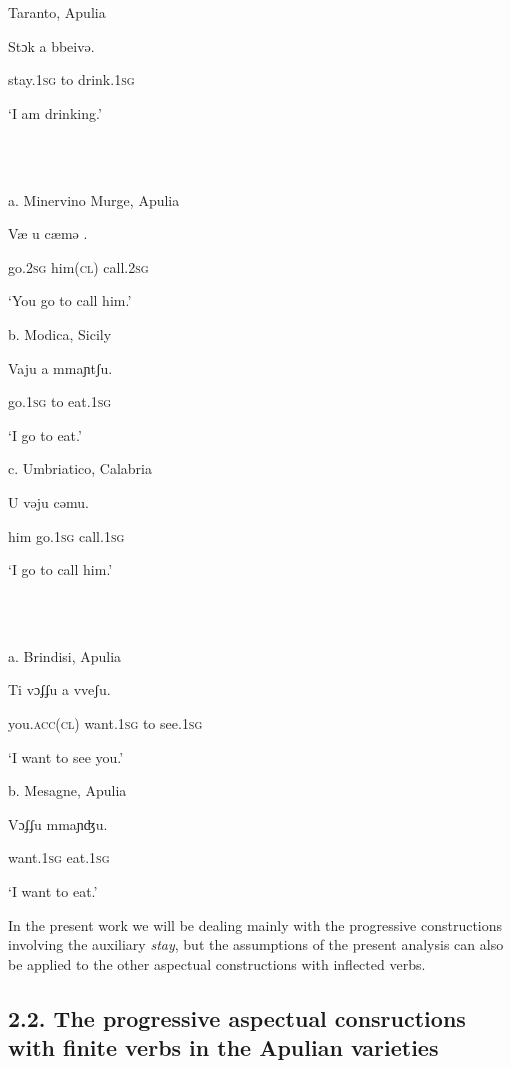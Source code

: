 \documentclass[output=paper]{langsci/langscibook}
\begin{document}
          Taranto, Apulia

Stɔk    a  bbeivə.     

stay.\textsc{1sg}  to  drink.\textsc{1sg}    

‘I am drinking.’

\ea%
    \label{ex:key:12}
    \gll\\
        \\
    \glt
    \z

          a.  Minervino Murge, Apulia

    Væ    u    cæmə .

go.\textsc{2sg}  him(\textsc{cl})   call.\textsc{2sg}    

‘You go to call him.’

b.  Modica, Sicily

Vaju    a  mmaɲtʃu.       

go.\textsc{1sg} to  eat.\textsc{1sg}

‘I go to eat.’     

c.  Umbriatico, Calabria

U    vəju    cəmu.

him  go.\textsc{1sg}  call.\textsc{1sg}

‘I go to call him.’

\ea%
    \label{ex:key:13}
    \gll\\
        \\
    \glt
    \z

          a.  Brindisi, Apulia

Ti      vɔʄʄu    a  vveʃu.    

you\textsc{.acc(cl)} want.\textsc{1sg}  to  see.\textsc{1sg}

‘I want to see you.’

b.  Mesagne, Apulia

  Vɔʄʄu    mmaɲʤu.          

want.\textsc{1sg}   eat.\textsc{1sg}

‘I want to eat.’

In the present work we will be dealing mainly with the progressive constructions involving the auxiliary \textit{stay}, but the assumptions of the present analysis can also be applied to the other aspectual constructions with inflected verbs.

\subsection{ 2.2. The progressive aspectual consructions with finite verbs in the Apulian varieties}
\end{document}
